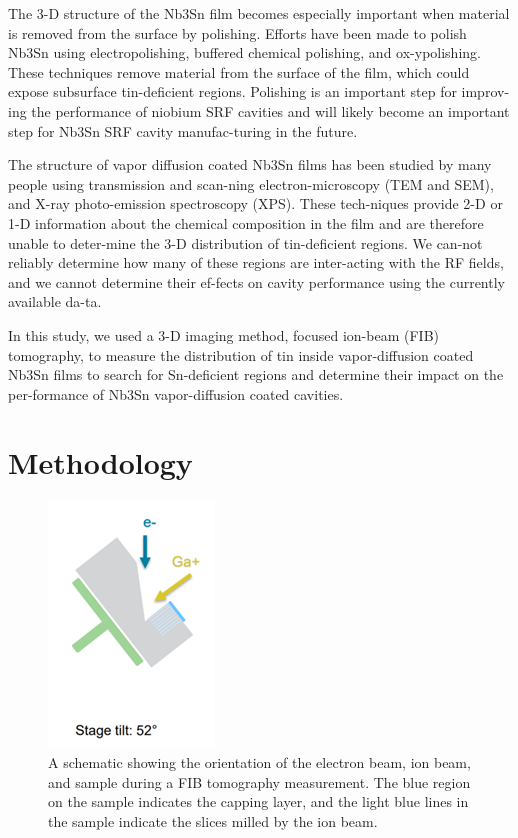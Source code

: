 The 3-D structure of the Nb3Sn film becomes especially important when material is removed from the surface by polishing. Efforts have been made to polish Nb3Sn using electropolishing\cite{hu2019reducing}, buffered chemical polishing\cite{hu2019reducing}, and ox-ypolishing\cite{pudasaini2018studies}. These techniques remove material from the surface of the film, which could expose subsurface tin-deficient regions. Polishing is an important step for improv-ing the performance of niobium SRF cavities and will likely become an important step for Nb3Sn SRF cavity manufac-turing in the future. 

The structure of vapor diffusion coated Nb3Sn films has been studied by many people using transmission and scan-ning electron-microscopy (TEM and SEM)\cite{lee2018atomic,becker2015analysis,hall2017surface,hall2016surface}, and X-ray photo-emission spectroscopy (XPS)\cite{pudasaini2019growth,sun2019fast,hall2016surface}. These tech-niques provide 2-D or 1-D information about the chemical composition in the film and are therefore unable to deter-mine the 3-D distribution of tin-deficient regions. We can-not reliably determine how many of these regions are inter-acting with the RF fields, and we cannot determine their ef-fects on cavity performance using the currently available da-ta. 

In this study, we used a 3-D imaging method, focused ion-beam (FIB) tomography, to measure the distribution of tin inside vapor-diffusion coated Nb3Sn films to search for Sn-deficient regions and determine their impact on the per-formance of Nb3Sn vapor-diffusion coated cavities.

\section{Methodology}

\begin{figure}[htb]%
    \centering%
    \includegraphics[width=0.25\columnwidth]{../figs/Figure-1.png}%
    \caption{A schematic showing the orientation of the electron beam, ion beam, and sample during a FIB tomography measurement. The blue region on the sample indicates the capping layer, and the light blue lines in the sample indicate the slices milled by the ion beam.}%
    \label{fig:1}%
\end{figure}


